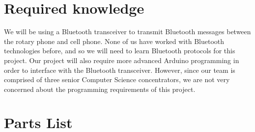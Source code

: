 \documentclass[11pt]{article}
\begin{document}
    \section{Required knowledge}
        We will be using a Bluetooth transceiver to transmit Bluetooth messages between the rotary phone and cell phone. None of us have worked with Bluetooth technologies before, and so we will need to learn Bluetooth protocols for this project. Our project will also require more advanced Arduino programming in order to interface with the Bluetooth transceiver. However, since our team is comprised of three senior Computer Science concentrators, we are not very concerned about the programming requirements of this project.

    \section{Parts List}
\end{document}
